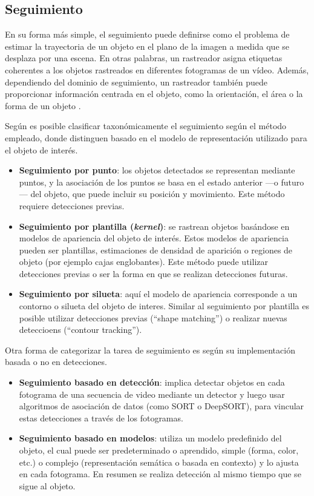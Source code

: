 \subsection{Seguimiento}
En su forma más simple, el seguimiento puede definirse como el problema de estimar la trayectoria de un objeto en el plano de la imagen a medida que se desplaza por una escena. En otras palabras, un rastreador asigna etiquetas coherentes a los objetos rastreados en diferentes fotogramas de un vídeo. Además, dependiendo del dominio de seguimiento, un rastreador también puede proporcionar información centrada en el objeto, como la orientación, el área o la forma de un objeto \cite{Yilmaz2006}.

Según \cite[Yilmaz et al.]{Yilmaz2006} es posible clasificar taxonómicamente el seguimiento según el método empleado, donde distinguen basado en el modelo de representación utilizado para el objeto de interés.
     
\begin{itemize}
    \item \textbf{Seguimiento por punto}: los objetos detectados se representan mediante puntos, y la asociación de los puntos se basa en el estado anterior ---o futuro--- del objeto, que puede incluir su posición y movimiento. Este método requiere detecciones previas.
    \item \textbf{Seguimiento por plantilla (\textit{kernel})}: se rastrean objetos basándose en modelos de apariencia del objeto de interés. Estos modelos de apariencia pueden ser plantillas, estimaciones de densidad de aparición o regiones de objeto (por ejemplo cajas englobantes). Este método puede utilizar detecciones previas o ser la forma en que se realizan detecciones futuras.
    \item \textbf{Seguimiento por silueta}: aquí el modelo de apariencia corresponde a un contorno o silueta del objeto de interes. Similar al seguimiento por plantilla es posible utilizar detecciones previas (``shape matching'') o realizar nuevas deteccioens (``contour tracking'').
\end{itemize}

Otra forma de categorizar la tarea de seguimiento es según su implementación basada o no en detecciones.

\begin{itemize}
    \item \textbf{Seguimiento basado en detección}: implica detectar objetos en cada fotograma de una secuencia de video mediante un detector y luego usar algoritmos de asociación de datos (como SORT o DeepSORT), para vincular estas detecciones a través de los fotogramas. 

    \item \textbf{Seguimiento basado en modelos}: utiliza un modelo predefinido del objeto, el cual puede ser predeterminado o aprendido, simple (forma, color, etc.) o complejo (representación semática o basada en contexto) y lo ajusta en cada fotograma. En resumen se realiza detección al mismo tiempo que se sigue al objeto.
\end{itemize}

